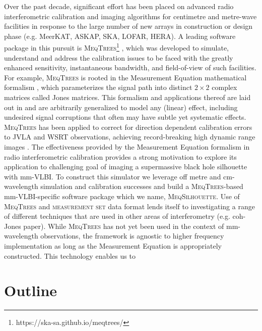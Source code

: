 Over the past decade, significant effort has been placed on advanced radio interferometric calibration and imaging algorithms for centimetre and metre-wave facilities in response to the large number of new arrays in construction or design phase (e.g. MeerKAT, ASKAP, SKA, LOFAR, HERA). A leading software package in this pursuit is \textsc{MeqTrees}\footnote{https://ska-sa.github.io/meqtrees/} \citep*{Noordam_2010}, which was developed to simulate, understand and address the calibration issues to be faced with the greatly enhanced sensitivity, instantaneous bandwidth, and field-of-view of such facilities. For example, \textsc{MeqTrees} is rooted in the Measurement Equation mathematical formalism \citep{Hamaker_1996}, which parameterizes the signal path into distinct $2 \times 2$ complex  matrices called Jones matrices. This formalism and applications thereof are laid out in \citep{Smirnov_2011a,Smirnov_2011b,Smirnov_2011c} and are arbitrarily generalized to model any (linear) effect, including undesired signal corruptions that often may have subtle yet systematic effects. \textsc{MeqTrees} has been applied to correct for direction dependent calibration errors to JVLA and WSRT observations, achieving record-breaking high dynamic range images \citep{Smirnov_2011c}. The effectiveness provided by the Measurement Equation formalism in radio interferometric calibration provides a strong motivation to explore its application to challenging goal of imaging a supermassive black hole silhouette with mm-VLBI. To construct this simulator we leverage off metre and cm-wavelength simulation and calibration successes and build a \textsc{MeqTrees}-based mm-VLBI-specific software package which we name, \textsc{MeqSilhouette}.  Use of \textsc{MeqTrees} and \textsc{measurement set} data format lends itself to investigating a range of different techniques that are used in other areas of interferometry (e.g. coh-Jones paper). While \textsc{MeqTrees} has not yet been used in the context of mm-wavelength observations, the framework is agnostic to higher frequency implementation as long as the Measurement Equation is appropriately constructed. This technology enables us to


\section{Outline}

